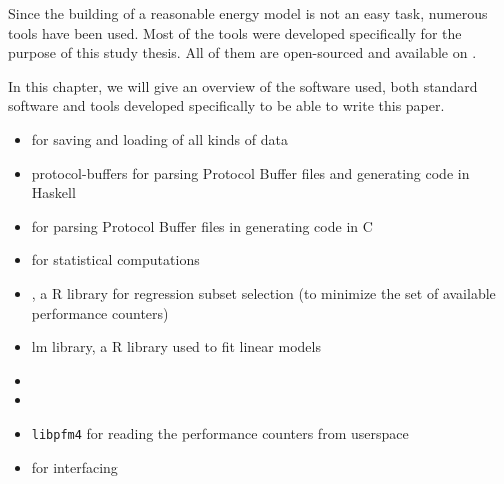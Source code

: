 \label{sec:tools}

Since the building of a reasonable energy model is not an easy task, numerous
tools have been used. Most of the tools were developed specifically for the
purpose of this study thesis. All of them are open-sourced and available on
.

In this chapter, we will give an overview of the software used, both standard
software and tools developed specifically to be able to write this paper.


\label{sec:standard-software}

\begin{itemize}

\item \JWTprotobuf for saving and loading of all kinds of data

\item {}
                  {protocol-buffers} for parsing Protocol Buffer files and
generating code in Haskell

\item {}
      for parsing Protocol Buffer files in generating code in C

\item {} for statistical computations

\item {}
      , a R library for regression subset selection (to minimize the set of
      available performance counters)

\item {}
      {lm library}, a R library used to fit linear models

\item {}

\item {}

\item {}
      {\texttt{libpfm4}} for reading the performance counters from userspace

\item \JWTnidaqmxbase for interfacing \JWPni

\end{itemize}


